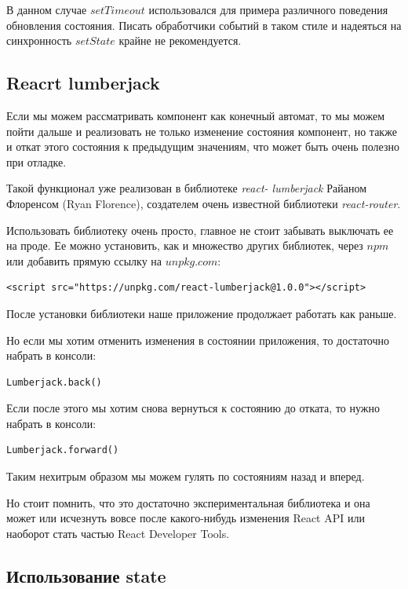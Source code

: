 В данном случае $setTimeout$ использовался для примера различного поведения обновления состояния. Писать обработчики событий в таком стиле и надеяться на синхронность $setState$ крайне не рекомендуется.

\subsection{Reacrt lumberjack}

Если мы можем рассматривать компонент как конечный автомат, то мы можем пойти дальше и реализовать не только изменение состояния компонент, но также и откат этого состояния к предыдущим значениям, что может быть очень полезно при отладке.

Такой функционал уже реализован в библиотеке \textit{react- lumberjack} Райаном Флоренсом (Ryan Florence), создателем очень известной библиотеки \textit{react-router}.

Использовать библиотеку очень просто, главное не стоит забывать выключать ее на проде.
Ее можно установить, как и множество других библиотек, через $npm$ или добавить прямую ссылку на $unpkg.com$:

\begin{lstlisting}
<script src="https://unpkg.com/react-lumberjack@1.0.0"></script>
\end{lstlisting}

После установки библиотеки наше приложение продолжает работать как раньше. 

Но если мы хотим отменить изменения в состоянии приложения, то достаточно набрать в консоли:

\begin{lstlisting}
Lumberjack.back()
\end{lstlisting}

Если после этого мы хотим снова вернуться к состоянию до отката, то нужно набрать в консоли:

\begin{lstlisting}
Lumberjack.forward()
\end{lstlisting}

Таким нехитрым образом мы можем гулять по состояниям назад и вперед.

Но стоит помнить, что это достаточно экспериментальная библиотека и она может или исчезнуть вовсе после какого-нибудь изменения React API или наоборот стать частью React Developer Tools.

\subsection{Использование state}

